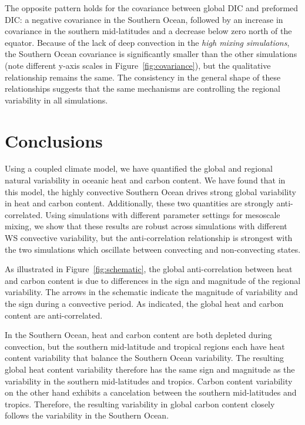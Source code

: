 The opposite pattern holds for the covariance between global DIC
and preformed DIC: a negative covariance in the Southern Ocean, followed
by an increase in covariance in the southern mid-latitudes and a decrease below
zero north of the equator. Because of the lack of deep convection in the
\textit{high mixing simulations}, the Southern Ocean covariance is significantly smaller
than the other simulations (note different y-axis scales in
Figure~\ref{fig:covariance}), but the qualitative relationship remains the same.
The consistency in the general shape of these relationships suggests that the
same mechanisms are controlling the regional variability in all simulations.




\section{Conclusions}
\label{section:conclusions}
Using a coupled climate model, we have quantified the global
and regional natural variability in oceanic heat and carbon content. We have
found that in this model, the highly convective Southern Ocean drives strong
global variability in heat and carbon content. Additionally, these two
quantities are strongly anti-correlated.  Using simulations with different
parameter settings for mesoscale mixing, we show that these results are robust
across simulations with different WS convective variability, but the
anti-correlation relationship is strongest with the two simulations which oscillate
between convecting and non-convecting states.

As illustrated in Figure~\ref{fig:schematic}, the global anti-correlation
between heat and carbon content is due to differences in the sign and magnitude
of the regional variability. The arrows in the schematic indicate the magnitude
of variability and the sign during a convective period. As indicated, the global
heat and carbon content are anti-correlated.

In the Southern Ocean, heat and
carbon content are both depleted during convection, but the southern
mid-latitude and tropical regions each have heat content variability that
balance the Southern Ocean variability. The resulting global heat content
variability therefore has the same sign and magnitude as the variability in the
southern mid-latitudes and tropics.
Carbon content variability on the other hand exhibits a cancelation between the
southern mid-latitudes and tropics. Therefore, the resulting variability in
global carbon content closely follows the variability in the Southern Ocean.


